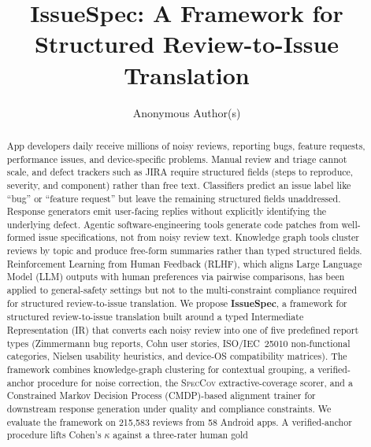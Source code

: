 \documentclass[sigconf, anonymous]{acmart}
\begin{document}
\title[IssueSpec]{\large IssueSpec: A Framework for Structured Review-to-Issue Translation}

\author{Anonymous Author(s)}

\renewcommand{\shortauthors}{Anonymous}

\begin{abstract}
  App developers daily receive millions of noisy reviews, reporting bugs, feature requests,
  performance issues, and device-specific problems. Manual review and triage cannot scale, and
  defect trackers such as JIRA require structured fields (steps to reproduce, severity, and
  component) rather than free text. Classifiers predict an issue label like ``bug'' or ``feature
   request'' but leave the remaining structured fields unaddressed. Response generators emit
  user-facing replies without explicitly identifying the underlying defect. Agentic
  software-engineering tools generate code patches from well-formed issue specifications, not
  from noisy review text. Knowledge graph tools cluster reviews by topic and produce free-form
  summaries rather than typed structured fields. Reinforcement Learning from Human Feedback
  (RLHF), which aligns Large Language Model (LLM) outputs with human preferences via pairwise
  comparisons, has been applied to general-safety settings but not to the multi-constraint
  compliance required for structured review-to-issue translation. We propose \textbf{IssueSpec},
   a framework for structured review-to-issue translation built around a typed Intermediate
  Representation (IR) that converts each noisy review into one of five predefined report types
  (Zimmermann bug reports, Cohn user stories, ISO/IEC~25010 non-functional categories, Nielsen
  usability heuristics, and device-OS compatibility matrices). The framework combines
  knowledge-graph clustering for contextual grouping, a verified-anchor procedure for noise
  correction, the \textsc{SpecCov} extractive-coverage scorer, and a Constrained Markov
  Decision Process (CMDP)-based alignment trainer for downstream response generation under
  quality and compliance constraints. We evaluate the framework on 215{,}583 reviews from 58
  Android apps. A verified-anchor procedure lifts Cohen's $\kappa$ against a three-rater human gold

\end{abstract}
\end{document}
